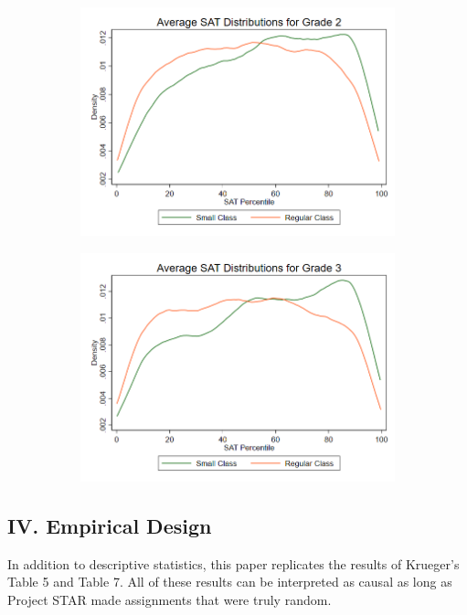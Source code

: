 \documentclass[a4paper,11pt]{article}
\begin{document}
\begin{figure}[H]
\begin{subfigure}{0.5\textwidth}
	\includegraphics[width=\linewidth]{figure1_2.png}
\end{subfigure}
\begin{subfigure}{0.5\textwidth}
	\includegraphics[width=\linewidth]{figure1_3.png}
\end{subfigure}
\end{figure} 



\subsection*{IV. Empirical Design}
In addition to descriptive statistics, this paper replicates the results of Krueger's Table 5 and Table 7. All of these results can be interpreted as causal as long as Project STAR made assignments that were truly random. \par
\end{document}
